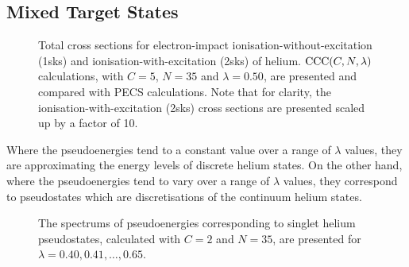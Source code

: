 \documentclass[]{article}
\begin{document}
\clearpage

\subsection{Mixed Target States}
\label{sec:re-mixed}




\begin{figure}[h]
  \begin{center}
    
  \end{center}
  \caption[TICS-with-excitation: $\mathrm{CCC}\lr{C, 35, 0.50}$]{
    Total cross sections for electron-impact ionisation-without-excitation
    (1sks) and ionisation-with-excitation (2sks) of helium.
    $\mathrm{CCC}(C, N, \lambda)$ calculations, with $C = 5$, $N = 35$ and
    $\lambda = 0.50$, are presented and compared with PECS
    \cite{PhysRevA.81.022716} calculations.
    Note that for clarity, the ionisation-with-excitation (2sks) cross sections
    are presented scaled up by a factor of 10.
  }
  \label{fig:cs_35}
\end{figure}

\clearpage


Where the pseudoenergies tend to a constant value over a range of $\lambda$
values, they are approximating the energy levels of discrete helium states.
On the other hand, where the pseudoenergies tend to vary over a range of
$\lambda$ values, they correspond to pseudostates which are discretisations of
the continuum helium states.


\begin{figure}[h]
  \begin{center}
    
  \end{center}
  \caption[Singlet Helium Pseudoenergies]{
    The spectrums of pseudoenergies corresponding to singlet helium
    pseudostates, calculated with $C = 2$ and $N = 35$, are presented for
    $\lambda = 0.40, 0.41, \dotsc, 0.65$.
  }
  \label{fig:he_state_singlet}
\end{figure}
\end{document}

